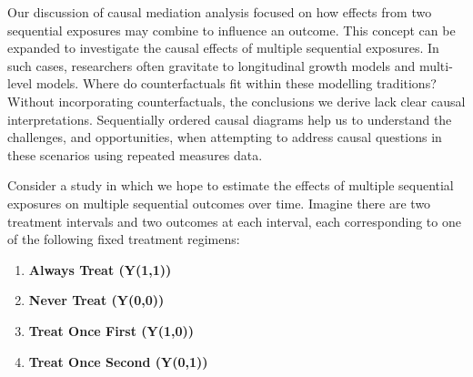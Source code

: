 \documentclass[
  singlecolumn]{article}
\providecommand{\tightlist}{%
  \setlength{\itemsep}{0pt}\setlength{\parskip}{0pt}}\usepackage{longtable,booktabs,array}
\begin{document}
Our discussion of causal mediation analysis focused on how effects from
two sequential exposures may combine to influence an outcome. This
concept can be expanded to investigate the causal effects of multiple
sequential exposures. In such cases, researchers often gravitate to
longitudinal growth models and multi-level models. Where do
counterfactuals fit within these modelling traditions? Without
incorporating counterfactuals, the conclusions we derive lack clear
causal interpretations. Sequentially ordered causal diagrams help us to
understand the challenges, and opportunities, when attempting to address
causal questions in these scenarios using repeated measures data.

Consider a study in which we hope to estimate the effects of multiple
sequential exposures on multiple sequential outcomes over time. Imagine
there are two treatment intervals and two outcomes at each interval,
each corresponding to one of the following fixed treatment regimens:

\begin{enumerate}
\def\labelenumi{\arabic{enumi}.}
\tightlist
\item
  \textbf{Always Treat (Y(1,1))}
\item
  \textbf{Never Treat (Y(0,0))}
\item
  \textbf{Treat Once First (Y(1,0))}
\item
  \textbf{Treat Once Second (Y(0,1))}
\end{enumerate}
\end{document}

